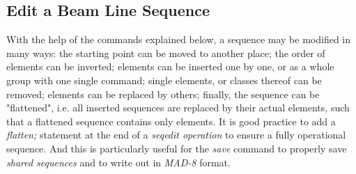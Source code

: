 




\subsection{Edit a Beam Line Sequence}

 With the help of the commands explained below, a sequence may be modified in many ways: the starting point can be moved to another place; the order of elements can be inverted; elements can be inserted one by one, or as a whole group with one single command; single elements, or classes thereof can be removed; elements can be replaced by others; finally, the sequence can be "flattened", i.e. all inserted sequences are replaced by their actual elements, such that a flattened sequence contains only elements. It is good practice to add a \textit{ flatten; } statement at the end of a \textit{ seqedit operation } to ensure a fully operational sequence. And this is particularly useful for the \textit{ save } command to properly save \textit{ shared sequences } and to write out in \textit{ MAD-8 } format.  



